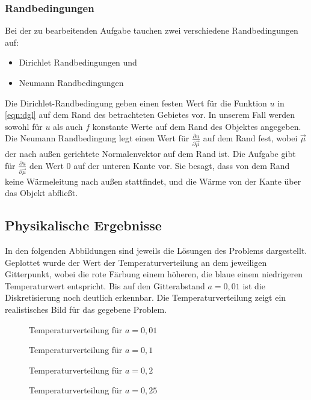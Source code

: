 \documentclass[10pt,a4paper]{article}
\begin{document}
\subsubsection{Randbedingungen}
\label{randbedingungen}
Bei der zu bearbeitenden Aufgabe tauchen zwei verschiedene Randbedingungen auf:
\begin{itemize}
\item Dirichlet Randbedingungen und
\item Neumann Randbedingungen
\end{itemize}
Die Dirichlet-Randbedingung geben einen festen Wert für die Funktion $u$ in \ref{eqn:dgl} auf dem Rand des betrachteten Gebietes vor. In unserem Fall werden sowohl für $u$ als auch $f$ konstante Werte auf dem Rand des Objektes angegeben. Die Neumann Randbedingung legt einen Wert für $\frac{\partial u}{\partial \vec{\mu}}$ auf dem Rand fest, wobei $\vec{\mu}$ der nach außen gerichtete Normalenvektor auf dem Rand ist. Die Aufgabe gibt für $\frac{\partial u}{\partial \vec{\mu}}$ den Wert $0$ auf der unteren Kante vor. Sie besagt, dass von dem Rand keine Wärmeleitung nach außen stattfindet, und die Wärme von der Kante über das Objekt abfließt. 

\subsection{Physikalische Ergebnisse}
In den folgenden Abbildungen sind jeweils die Lösungen des Problems dargestellt. Geplottet wurde der Wert der Temperaturverteilung an dem jeweiligen Gitterpunkt, wobei die rote Färbung einem höheren, die blaue einem niedrigeren Temperaturwert entspricht. Bis auf den Gitterabstand $a=0,01$ ist die Diskretisierung noch deutlich erkennbar.
Die Temperaturverteilung zeigt ein realistisches Bild für das gegebene Problem.

\begin{figure}[htbp!]
\begin{minipage}[c]{0.5\textwidth}
\centering
\vspace{-60pt}
\scalebox{0.9}{}
\vspace{-40pt}
\caption{Temperaturverteilung für $a=0,01$}
\label{fig:a_1}
\vspace{-20pt}
\scalebox{0.9}{}
\vspace{-40pt}
\caption{Temperaturverteilung für $a=0,1$}
\label{fig:a_10}
\end{minipage}
\begin{minipage}[c]{0.5\textwidth}
\centering
\vspace{-60pt}
\scalebox{0.9}{}
\vspace{-40pt}
\caption{Temperaturverteilung für $a=0,2$}
\label{fig:a_20}
\vspace{-20pt}
\scalebox{0.9}{}
\vspace{-40pt}
\caption{Temperaturverteilung für $a=0,25$}
\label{fig:a_25}
\end{minipage}
\end{figure}
\end{document}
